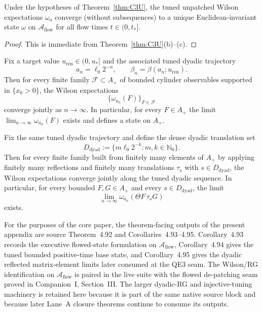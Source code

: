 \begin{corollary}
Under the hypotheses of Theorem~\ref{thm:C3U}, the tuned unpatched Wilson expectations $\omega_a$ converge (without subsequences) to a unique Euclidean-invariant state $\omega$ on $\mathcal A_{\mathrm{flow}}$ for all flow times $t\in(0,t_\ast]$.
\end{corollary}

\begin{proof}
This is immediate from Theorem~\ref{thm:C3U}(b)--(c).
\end{proof}

\begin{corollary}
Fix a target value $u_{\mathrm{ren}}\in (0,u_\ast]$ and the associated tuned dyadic trajectory
\[
a_n=\ell_0 2^{-n},
\qquad
\beta_n = \beta(a_n;u_{\mathrm{ren}}).
\]
Then for every finite family $\mathcal F\subset A_+$ of bounded cylinder observables supported in $\{x_0>0\}$, the Wilson expectations
\[
\{\omega_{a_n}(F)\}_{F\in\mathcal F}
\]
converge jointly as $n\to\infty$. In particular, for every $F\in A_+$ the limit $\lim_{n\to\infty}\omega_{a_n}(F)$ exists and defines a state on $A_+$.
\end{corollary}

\begin{corollary}
Fix the same tuned dyadic trajectory and define the dense dyadic translation set
\[
D_{\mathrm{dyad}}:=\{m\ell_0 2^{-k}: m,k\in\mathbb N_0\}.
\]
Then for every finite family built from finitely many elements of $A_+$ by applying finitely many reflections and finitely many translations $\tau_s$ with $s\in D_{\mathrm{dyad}}$, the Wilson expectations converge jointly along the tuned dyadic sequence. In particular, for every bounded $F,G\in A_+$ and every $s\in D_{\mathrm{dyad}}$, the limit
\[
\lim_{n\to\infty}\omega_{a_n}(\Theta F\,\tau_s G)
\]
exists.
\end{corollary}

\begin{remark}
For the purposes of the core paper, the theorem-facing outputs of the present appendix are source Theorem~4.92 and Corollaries~4.93--4.95. Corollary~4.93 records the executive flowed-state formulation on $\mathcal A_{\mathrm{flow}}$, Corollary~4.94 gives the tuned bounded positive-time base state, and Corollary~4.95 gives the dyadic reflected matrix-element limits later consumed at the QE3 seam. The Wilson/RG identification on $\mathcal A_{\mathrm{flow}}$ is paired in the live suite with the flowed de-patching seam proved in Companion~I, Section~III. The larger dyadic-RG and injective-tuning machinery is retained here because it is part of the same native source block and because later Lane~A closure theorems continue to consume its outputs.
\end{remark}
